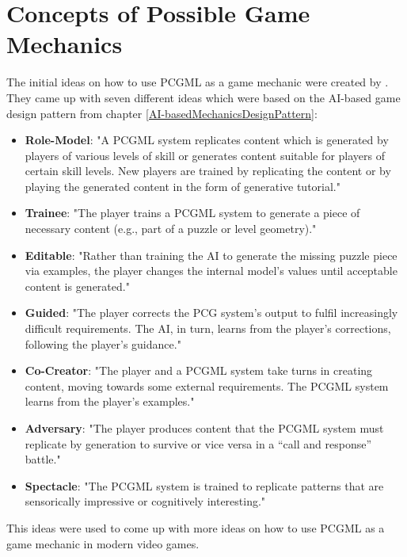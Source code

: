 \documentclass[MGS,Master,english]{twbook}%
\begin{document}
\section{Concepts of Possible Game Mechanics}
The initial ideas on how to use PCGML as a game mechanic were created by \cite{pcgml::paper}. They came up with seven different ideas which were based on the AI-based game design pattern from chapter \ref{AI-basedMechanicsDesignPattern}:
\begin{itemize}
	\item \textbf{Role-Model}: "A \ac{PCGML} system replicates content which is generated by players of various levels of skill or generates content suitable for players of certain skill levels. New players are trained by replicating the content or by playing the generated content in the form of generative tutorial." \cite{pcgml::paper}
	\item \textbf{Trainee}: "The player trains a \ac{PCGML} system to generate a piece of necessary content (e.g., part of a puzzle or level geometry)." \cite{pcgml::paper}
	\item \textbf{Editable}: "Rather than training the AI to generate the missing puzzle piece via examples, the player changes the internal model’s values until acceptable content is generated." \cite{pcgml::paper}
	\item \textbf{Guided}: "The player corrects the \ac{PCG} system’s output to fulfil increasingly difficult requirements. The \ac{AI}, in turn, learns from the player’s corrections, following the player’s guidance." \cite{pcgml::paper}
	\item \textbf{Co-Creator}: "The player and a \ac{PCGML} system take turns in creating content, moving towards some external requirements. The \ac{PCGML} system learns from the player’s examples." \cite{pcgml::paper} 
	\item \textbf{Adversary}: "The player produces content that the \ac{PCGML} system must replicate by generation to survive or vice versa in a “call and response” battle." \cite{pcgml::paper}
	\item \textbf{Spectacle}: "The \ac{PCGML} system is trained to replicate patterns that are sensorically impressive or cognitively interesting." \cite{pcgml::paper}
\end{itemize}
This ideas were used to come up with more ideas on how to use PCGML as a game mechanic in modern video games.
\end{document}
